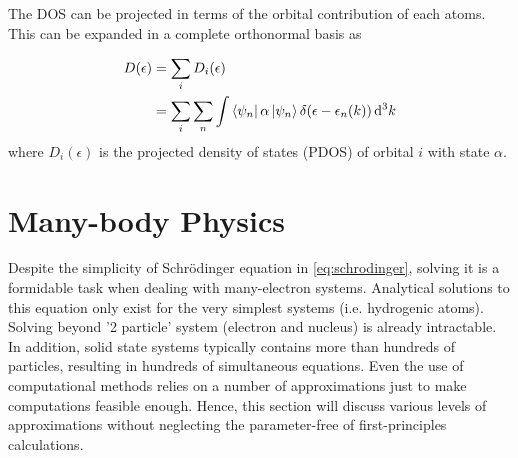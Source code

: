 The DOS can be projected in terms of the orbital contribution of each atoms. This can be expanded in a complete orthonormal basis as \citep{Enkovaara2010}

\begin{align}
	D(\epsilon) & = \sum_i D_i(\epsilon)                                                                            \\
	            & = \sum_i \sum_n \int \bra{\psi_n} \alpha \ket{\psi_n}  \delta(\epsilon - \epsilon_n(k)) \dd[3]{k}
\end{align}
where $D_i(\epsilon)$ is the projected density of states (PDOS) of orbital $i$ with state $\alpha$.

\section{Many-body Physics}
Despite the simplicity of Schr\"{o}dinger equation in \eqref{eq:schrodinger}, solving it is a formidable task when dealing with many-electron systems. Analytical solutions to this equation only exist for the very simplest systems (i.e. hydrogenic atoms). Solving beyond '2 particle' system (electron and nucleus) is already intractable. In addition, solid state systems typically contains more than hundreds of particles, resulting in hundreds of simultaneous equations. Even the use of computational methods relies on a number of approximations just to make computations feasible enough. Hence, this section will discuss various levels of approximations without neglecting the parameter-free of first-principles calculations.

